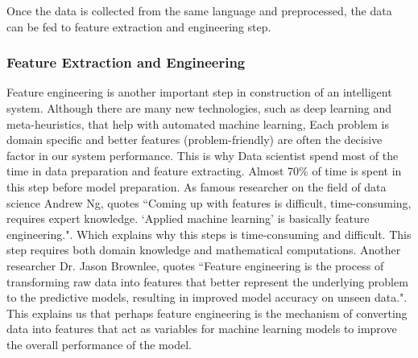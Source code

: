 Once the data is collected from the same language and preprocessed, the data can be fed to feature extraction and engineering step.

\subsubsection{Feature Extraction and Engineering} \label{backgroundworkFeatureEngi}

Feature engineering is another important step in construction of an intelligent system. Although there are many new technologies, such as deep learning and meta-heuristics, that help with automated machine learning, Each problem is domain specific and better features (problem-friendly) are often the decisive factor in our system performance. This is why Data scientist spend most of the time in data preparation and feature extracting. Almost 70\% of time is spent in this step before model preparation. As famous researcher on the field of data science Andrew Ng, quotes ``Coming up with features is difficult, time-consuming, requires expert knowledge. `Applied machine learning' is basically feature engineering.". Which explains why this steps is time-consuming and difficult. This step requires both domain knowledge and mathematical computations. Another researcher Dr. Jason Brownlee, quotes ``Feature engineering is the process of transforming raw data into features that better represent the underlying problem to the predictive models, resulting in improved model accuracy on unseen data.". This explains us that perhaps feature engineering is the mechanism of converting data into features that act as variables for machine learning models to improve the overall performance of the model.


